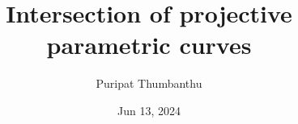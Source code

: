 \documentclass[b5paper, 11pt, openleft]{memoir}
\begin{document}
\title{Intersection of projective parametric curves}
\author{Puripat Thumbanthu}
\date{Jun 13, 2024}

\maketitle




\end{document}

